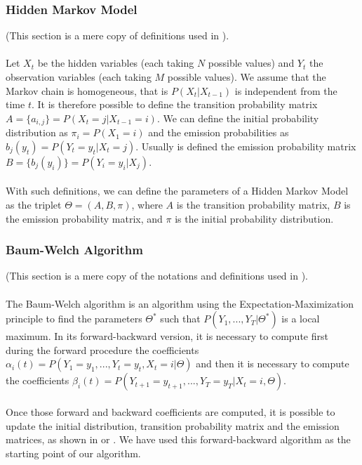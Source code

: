 \subsubsection*{Hidden Markov Model}
(This section is a mere copy of definitions used in \cite{wiki:BaumWelch_algorithm}).
\paragraph{}
Let $X_t$ be the hidden variables (each taking $N$ possible values) and $Y_t$ the observation variables (each taking $M$ possible values). We assume that the Markov chain is homogeneous, that is $P(X_t|X_{t-1})$ is independent from the time $t$.
It is therefore possible to define the transition probability matrix $A = \{a_{i,j}\} = P(X_t = j | X_{t-1} = i)$.
We can define the initial probability distribution as $\pi_i = P(X_1=i)$ and the emission probabilities as $b_j(y_t) = P(Y_t = y_t | X_t = j)$. Usually is defined the emission probability matrix $B = \{b_j(y_i)\} = P(Y_i=y_i | X_j)$.

\paragraph{}
With such definitions, we can define the parameters of a Hidden Markov Model as the triplet $\Theta = (A, B, \pi)$, where $A$ is the transition probability matrix, $B$ is the emission probability matrix, and $\pi$ is the initial probability distribution.

\subsubsection*{Baum-Welch Algorithm}
(This section is a mere copy of the notations and definitions used in \cite{wiki:BaumWelch_algorithm}).
\paragraph{}
The Baum-Welch algorithm is an algorithm using the Expectation-Maximization principle to find the parameters $\Theta^*$ such that $P(Y_1,...,Y_T| \Theta^* )$ is a local maximum.
In its forward-backward version, it is necessary to compute first during the forward procedure the coefficients $\alpha_i(t) = P(Y_1=y_1,...,Y_t = y_t, X_t = i | \Theta )$ and then it is necessary to compute the coefficients $\beta_i(t) = P(Y_{t+1}=y_{t+1},...,Y_T = y_T| X_t = i, \Theta )$.
\paragraph{}
Once those forward and backward coefficients are computed, it is possible to update the initial distribution, transition probability matrix and the emission matrices, as shown in \cite{rabiner1989tutorial} or \cite{wiki:BaumWelch_algorithm}. We have used this forward-backward algorithm as the starting point of our algorithm.

